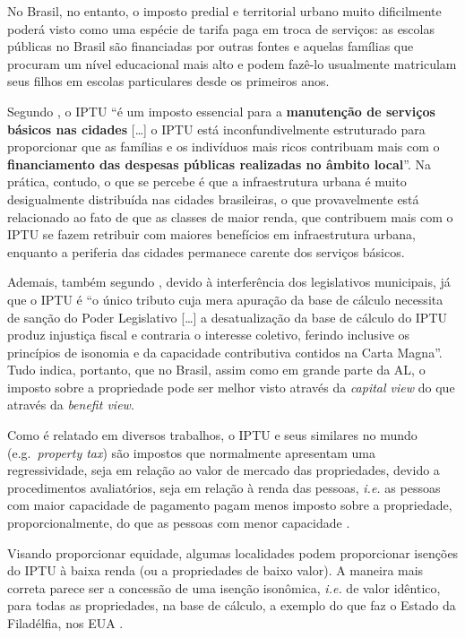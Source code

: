 \documentclass[
	12pt,				%
	oneside,			%
	a4paper,			%
	chapter=TITLE,		%
	section=TITLE,		%
	english,			%
	brazil				%
	]{abntex2}
\begin{document}
\begin{refsection}
No Brasil, no entanto, o imposto predial e territorial urbano muito dificilmente
poderá visto como uma espécie de tarifa paga em troca de serviços: as escolas
públicas no Brasil são financiadas por outras fontes e aquelas famílias que
procuram um nível educacional mais alto e podem fazê-lo usualmente matriculam
seus filhos em escolas particulares desde os primeiros anos.

Segundo \textcite[p.~86, grifo nosso]{decesare2020}, o \gls{IPTU} ``é um imposto essencial
para a \textbf{manutenção de serviços básicos nas cidades} {[}\ldots{]} o \gls{IPTU} está
inconfundivelmente estruturado para proporcionar que as famílias e os indivíduos
mais ricos contribuam mais com o \textbf{financiamento das despesas públicas
realizadas no âmbito local}''. Na prática, contudo, o que se percebe é que a
infraestrutura urbana é muito desigualmente distribuída nas cidades brasileiras,
o que provavelmente está relacionado ao fato de que as classes de maior renda,
que contribuem mais com o \gls{IPTU} se fazem retribuir com maiores benefícios
em infraestrutura urbana, enquanto a periferia das cidades permanece carente dos
serviços básicos.

Ademais, também segundo \textcite[p.~83-84]{decesare2020}, devido à interferência dos
legislativos municipais, já que o \gls{IPTU} é ``o único tributo cuja mera
apuração da base de cálculo necessita de sanção do Poder Legislativo {[}\ldots{]} a
desatualização da base de cálculo do \gls{IPTU} produz injustiça fiscal e
contraria o interesse coletivo, ferindo inclusive os princípios de isonomia e da
capacidade contributiva contidos na Carta Magna''. Tudo indica, portanto, que no
Brasil, assim como em grande parte da \gls{AL}, o imposto sobre a propriedade
pode ser melhor visto através da \emph{capital view} do que através da \emph{benefit view}.

Como é relatado em diversos trabalhos, o \gls{IPTU} e seus similares no mundo
(e.g.~\emph{property tax}) são impostos que normalmente apresentam uma regressividade,
seja em relação ao valor de mercado das propriedades, devido a procedimentos
avaliatórios, seja em relação à renda das pessoas, \emph{i.e.} as pessoas com maior
capacidade de pagamento pagam menos imposto sobre a propriedade,
proporcionalmente, do que as pessoas com menor capacidade \autocites[p.~3]{McMillen2020,landtax}{fonseca2020}.

Visando proporcionar equidade, algumas localidades podem proporcionar isenções
do \gls{IPTU} à baixa renda (ou a propriedades de baixo valor). A maneira mais
correta parece ser a concessão de uma isenção isonômica, \emph{i.e.} de valor
idêntico, para todas as propriedades, na base de cálculo, a exemplo do que faz o
Estado da Filadélfia, nos \gls{EUA} \autocite[p.~155]{McMillen2020}.


\end{refsection}
\end{document}
